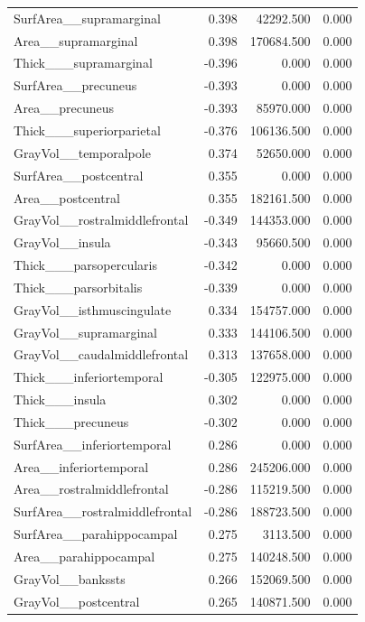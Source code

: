 \documentclass{article}
\begin{document}
\begin{longtable}{lrrr}
	SurfArea\_\_supramarginal & 0.398 & 42292.500 & 0.000 \\
	Area\_\_supramarginal & 0.398 & 170684.500 & 0.000 \\
	Thick\_\_\_supramarginal & -0.396 & 0.000 & 0.000 \\
	SurfArea\_\_precuneus & -0.393 & 0.000 & 0.000 \\
	Area\_\_precuneus & -0.393 & 85970.000 & 0.000 \\
	Thick\_\_\_superiorparietal & -0.376 & 106136.500 & 0.000 \\
	GrayVol\_\_temporalpole & 0.374 & 52650.000 & 0.000 \\
	SurfArea\_\_postcentral & 0.355 & 0.000 & 0.000 \\
	Area\_\_postcentral & 0.355 & 182161.500 & 0.000 \\
	GrayVol\_\_rostralmiddlefrontal & -0.349 & 144353.000 & 0.000 \\
	GrayVol\_\_insula & -0.343 & 95660.500 & 0.000 \\
	Thick\_\_\_parsopercularis & -0.342 & 0.000 & 0.000 \\
	Thick\_\_\_parsorbitalis & -0.339 & 0.000 & 0.000 \\
	GrayVol\_\_isthmuscingulate & 0.334 & 154757.000 & 0.000 \\
	GrayVol\_\_supramarginal & 0.333 & 144106.500 & 0.000 \\
	GrayVol\_\_caudalmiddlefrontal & 0.313 & 137658.000 & 0.000 \\
	Thick\_\_\_inferiortemporal & -0.305 & 122975.000 & 0.000 \\
	Thick\_\_\_insula & 0.302 & 0.000 & 0.000 \\
	Thick\_\_\_precuneus & -0.302 & 0.000 & 0.000 \\
	SurfArea\_\_inferiortemporal & 0.286 & 0.000 & 0.000 \\
	Area\_\_inferiortemporal & 0.286 & 245206.000 & 0.000 \\
	Area\_\_rostralmiddlefrontal & -0.286 & 115219.500 & 0.000 \\
	SurfArea\_\_rostralmiddlefrontal & -0.286 & 188723.500 & 0.000 \\
	SurfArea\_\_parahippocampal & 0.275 & 3113.500 & 0.000 \\
	Area\_\_parahippocampal & 0.275 & 140248.500 & 0.000 \\
	GrayVol\_\_bankssts & 0.266 & 152069.500 & 0.000 \\
	GrayVol\_\_postcentral & 0.265 & 140871.500 & 0.000 \\

\end{longtable}
\end{document}
